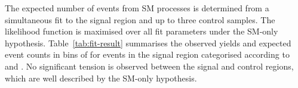 
The expected number of events from SM processes is determined from a
simultaneous fit to the signal region and up to three control
samples. The likelihood function is maximised over all fit parameters
under the SM-only hypothesis.
Table~\ref{tab:fit-result} summarises 
the observed yields and expected event counts in bins of \scalht for events
in the signal region categorised according to \njet and \nb. 
No significant tension is observed between the signal and control
regions, which are well described by the SM-only hypothesis.%

